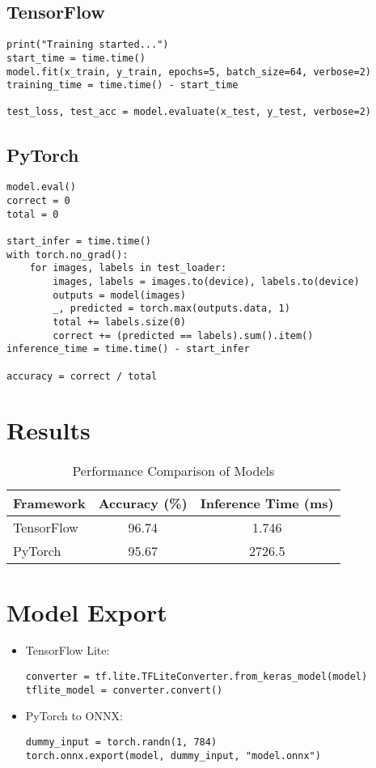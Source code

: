\documentclass[a4paper,12pt]{article}
\begin{document}
\subsection{TensorFlow}
\begin{lstlisting}
print("Training started...")
start_time = time.time()
model.fit(x_train, y_train, epochs=5, batch_size=64, verbose=2)
training_time = time.time() - start_time

test_loss, test_acc = model.evaluate(x_test, y_test, verbose=2)
\end{lstlisting}

\subsection{PyTorch}
\begin{lstlisting}
model.eval()
correct = 0
total = 0

start_infer = time.time()
with torch.no_grad():
    for images, labels in test_loader:
        images, labels = images.to(device), labels.to(device)
        outputs = model(images)
        _, predicted = torch.max(outputs.data, 1)
        total += labels.size(0)
        correct += (predicted == labels).sum().item()
inference_time = time.time() - start_infer

accuracy = correct / total
\end{lstlisting}

\section{Results}

\begin{table}[h]
\centering
\begin{tabular}{|l|c|c|}
\hline
\textbf{Framework} & \textbf{Accuracy (\%)} & \textbf{Inference Time (ms)} \\
\hline
TensorFlow         & 96.74                  & 1.746                        \\
PyTorch            & 95.67                  & 2726.5                       \\
\hline
\end{tabular}
\caption{Performance Comparison of Models}
\end{table}

\section{Model Export}
\begin{itemize}
    \item TensorFlow Lite:
    \begin{lstlisting}
converter = tf.lite.TFLiteConverter.from_keras_model(model)
tflite_model = converter.convert()
    \end{lstlisting}
    \item PyTorch to ONNX:
    \begin{lstlisting}
dummy_input = torch.randn(1, 784)
torch.onnx.export(model, dummy_input, "model.onnx")
    \end{lstlisting}
\end{itemize}
\end{document}

